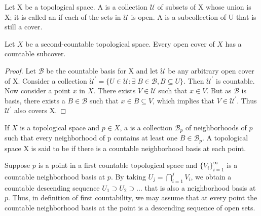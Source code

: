 \documentclass[11pt,a4paper]{article}
\begin{document}
\begin{definition}
    Let X be a topological space. A  is a collection $\mathcal{U}$ of subsets of X whose union is X; it is called an  if each of the sets in $\mathcal{U}$ is open. A  is a subcollection of U that is still a cover.
\end{definition}

\begin{proposition}\label{prop:countable_subcover}
Let $X$ be a second-countable topological space. Every open cover of $X$ has a countable subcover.
\end{proposition}

\begin{proof}
Let $\mathcal{B}$ be the countable basis for X and let $\mathcal{U}$ be any arbitrary open cover of X. Consider a collection $\mathcal{U}^\prime = \{U\in \mathcal{U}: \exists\; B\in \mathcal{B}, B\subseteq U\}$. Then $\mathcal{U}^\prime$ is countable. Now consider a point $x$ in $X$. There exists $V\in \mathcal{U}$ such that $x\in V$. But as $\mathcal{B}$ is basis, there exists a $B\in\mathcal{B}$ such that $x\in B\subseteq V$, which implies that $V\in \mathcal{U}^\prime$. Thus $\mathcal{U}^\prime$ also covers X.
\end{proof}

\begin{definition}\label{def:first_countable_space}
If $X$ is a topological space and $p\in X$, a  is a collection $\mathcal{B}_p$ of neighborhoods of $p$ such that every neighborhood of p contains at least one $B\in \mathcal{B}_p$. A topological space X is said to be  if there is a countable neighborhood basis at each point. 
\end{definition}

\begin{remark}\label{remark:descending_neighborhood_basis}
Suppose $p$ is a point in a first countable topological space and $\{V_i\}_{i=1}^\infty$ is a countable neighborhood basis at $p$. By taking $U_j = \bigcap_{i = 1}^j V_i$, we obtain a countable descending sequence $U_1\supset U_2\supset \ldots$ that is also a neighborhood basis at $p$. Thus, in definition of first countability, we may assume that at every point the countable neighborhood basis at the point is a descending sequence of open sets.
\end{remark}
\end{document}
